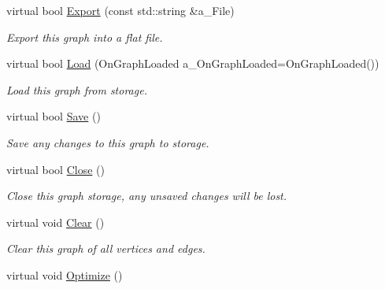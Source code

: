 \begin{DoxyCompactItemize}
virtual bool \hyperlink{class_graph_self_a841bcdcd8258023be6fad40620a8d0da}{Export} (const std\+::string \&a\+\_\+\+File)
\begin{DoxyCompactList}\small\item\em Export this graph into a flat file. \end{DoxyCompactList}\item 
\mbox{\label{class_graph_self_a347b1ef766600eba107974315bbd8ee6}} 
virtual bool \hyperlink{class_graph_self_a347b1ef766600eba107974315bbd8ee6}{Load} (On\+Graph\+Loaded a\+\_\+\+On\+Graph\+Loaded=On\+Graph\+Loaded())
\begin{DoxyCompactList}\small\item\em Load this graph from storage. \end{DoxyCompactList}\item 
\mbox{\label{class_graph_self_a9e084bd9c94d9eaedbccd6106392d79f}} 
virtual bool \hyperlink{class_graph_self_a9e084bd9c94d9eaedbccd6106392d79f}{Save} ()
\begin{DoxyCompactList}\small\item\em Save any changes to this graph to storage. \end{DoxyCompactList}\item 
\mbox{\label{class_graph_self_ad4ad936c38233bdd82d946410896387f}} 
virtual bool \hyperlink{class_graph_self_ad4ad936c38233bdd82d946410896387f}{Close} ()
\begin{DoxyCompactList}\small\item\em Close this graph storage, any unsaved changes will be lost. \end{DoxyCompactList}\item 
\mbox{\label{class_graph_self_aa6582df8149221d0bf2d234c53ca9f15}} 
virtual void \hyperlink{class_graph_self_aa6582df8149221d0bf2d234c53ca9f15}{Clear} ()
\begin{DoxyCompactList}\small\item\em Clear this graph of all vertices and edges. \end{DoxyCompactList}\item 
\mbox{\label{class_graph_self_a09c800ad3ad30f30837842aaae2497b0}} 
virtual void \hyperlink{class_graph_self_a09c800ad3ad30f30837842aaae2497b0}{Optimize} ()

\end{DoxyCompactItemize}
